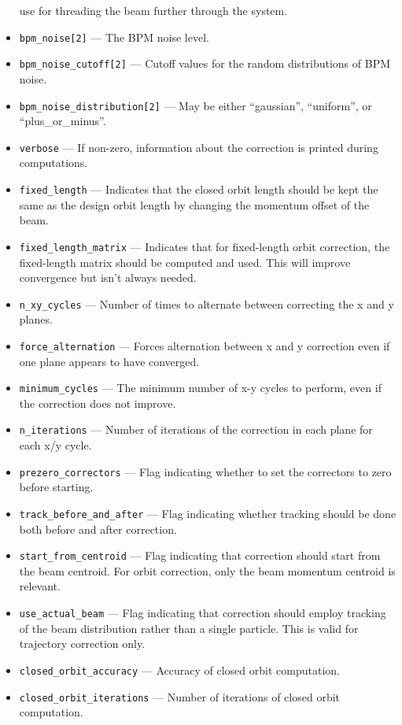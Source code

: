 \documentclass[11pt]{article}
\begin{document}
\begin{itemize}
  use for threading the beam further through the system.
\item \verb|bpm_noise[2]| --- The BPM noise level. 
\item \verb|bpm_noise_cutoff[2]| --- Cutoff values for the random distributions of BPM noise.
\item \verb|bpm_noise_distribution[2]| --- May be either ``gaussian'', ``uniform'', or ``plus\_or\_minus''.
\item \verb|verbose| --- If non-zero, information about the correction is printed during computations.
\item \verb|fixed_length| --- Indicates that the closed orbit length should be kept the same as the design orbit
length by changing the momentum offset of the beam.
\item \verb|fixed_length_matrix| --- Indicates that for fixed-length orbit correction, the fixed-length
matrix should be computed and used.  This will improve convergence but isn't always needed.
\item \verb|n_xy_cycles| --- Number of times to alternate between correcting the x and y planes.
\item \verb|force_alternation| --- Forces alternation between x and y correction even if one plane appears to 
  have converged.
\item \verb|minimum_cycles| --- The minimum number of x-y cycles to perform, even if the correction does not improve.
\item \verb|n_iterations| --- Number of iterations of the correction in each plane for each x/y cycle.
\item \verb|prezero_correctors| --- Flag indicating whether to set the correctors to zero before starting.
\item \verb|track_before_and_after| --- Flag indicating whether tracking should be done both before and after
correction.
\item \verb|start_from_centroid| --- Flag indicating that correction
should start from the beam centroid.  For orbit correction, only the
beam momentum centroid is relevant.
\item \verb|use_actual_beam| --- Flag indicating that correction
should employ tracking of the beam distribution rather than a single
particle.  This is valid for trajectory correction only.
\item \verb|closed_orbit_accuracy| --- Accuracy of closed orbit computation.
\item \verb|closed_orbit_iterations| --- Number of iterations of closed orbit computation.

\end{itemize}
\end{document}
